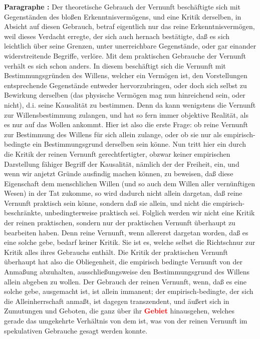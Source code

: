 \documentclass[a4paper,12pt,twoside]{book}
\newcommand{\match}[1]{\textcolor{red}{\textbf{#1}}}
\begin{document}
	\textbf{Paragraphe : }Der theoretische Gebrauch der Vernunft beschäftigte sich mit Gegenständen des bloßen Erkenntnisvermögens, und eine Kritik derselben, in Absicht auf diesen Gebrauch, betraf eigentlich nur das reine Erkenntnisvermögen, weil dieses Verdacht erregte, der sich auch hernach bestätigte, daß es sich leichtlich über seine Grenzen, unter unerreichbare Gegenstände, oder gar einander widerstreitende Begriffe, verlöre. Mit dem praktischen Gebrauche der Vernunft verhält es sich schon anders. In diesem beschäftigt sich die Vernunft mit Bestimmungsgründen des Willens, welcher ein Vermögen ist, den Vorstellungen entsprechende Gegenstände entweder hervorzubringen, oder doch sich selbst zu Bewirkung derselben (das physische Vermögen mag nun hinreichend sein, oder nicht), d.i. seine Kausalität zu bestimmen. Denn da kann wenigstens die Vernunft zur Willensbestimmung zulangen, und hat so fern immer objektive Realität, als es nur auf das Wollen ankommt. Hier ist also die erste Frage: ob reine Vernunft zur Bestimmung des Willens für sich allein zulange, oder ob sie nur als empirisch- bedingte ein Bestimmungsgrund derselben sein könne. Nun tritt hier ein durch die Kritik der reinen Vernunft gerechtfertigter, obzwar keiner empirischen Darstellung fähiger Begriff der Kausalität, nämlich der der Freiheit, ein, und wenn wir anjetzt Gründe ausfindig machen können, zu beweisen, daß diese Eigenschaft dem menschlichen Willen (und so auch dem Willen aller vernünftigen Wesen) in der Tat zukomme, so wird dadurch nicht allein dargetan, daß reine Vernunft praktisch sein könne, sondern daß sie allein, und nicht die empirisch-beschränkte, unbedingterweise praktisch sei. Folglich werden wir nicht eine Kritik der reinen praktischen, sondern nur der praktischen Vernunft überhaupt zu bearbeiten haben. Denn reine Vernunft, wenn allererst dargetan worden, daß es eine solche gebe, bedarf keiner Kritik. Sie ist es, welche selbst die Richtschnur zur Kritik alles ihres Gebrauchs enthält. Die Kritik der praktischen Vernunft überhaupt  hat also die Obliegenheit, die empirisch bedingte Vernunft von der Anmaßung abzuhalten, ausschließungsweise den Bestimmungsgrund des Willens allein abgeben zu wollen. Der Gebrauch der reinen Vernunft, wenn, daß es eine solche gebe, ausgemacht ist, ist allein immanent; der empirisch-bedingte, der sich die Alleinherrschaft anmaßt, ist dagegen transzendent, und äußert sich in Zumutungen und Geboten, die ganz über ihr \match{Gebiet} hinausgehen, welches gerade das umgekehrte Verhältnis von dem ist, was von der reinen Vernunft im spekulativen Gebrauche gesagt werden konnte. 
	
\end{document}
